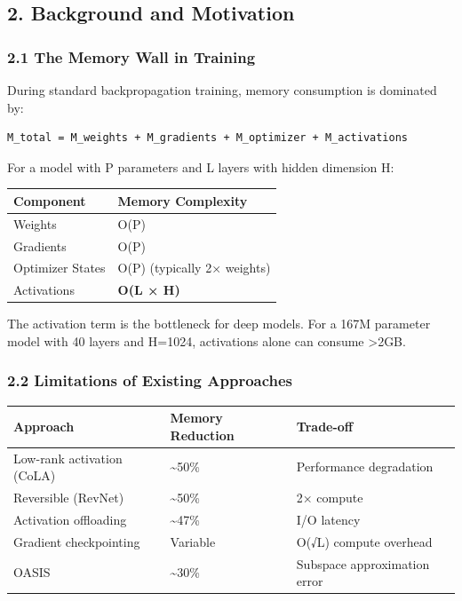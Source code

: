 \documentclass[
  11pt,
  a4paper,
]{article}
\begin{document}
\subsection{2. Background and
Motivation}\label{background-and-motivation}

\subsubsection{2.1 The Memory Wall in
Training}\label{the-memory-wall-in-training}

During standard backpropagation training, memory consumption is
dominated by:

\begin{verbatim}
M_total = M_weights + M_gradients + M_optimizer + M_activations
\end{verbatim}

For a model with P parameters and L layers with hidden dimension H:

\begin{longtable}[]{@{}ll@{}}
\toprule\noalign{}
Component & Memory Complexity \\
\midrule\noalign{}
\endhead
\bottomrule\noalign{}
\endlastfoot
Weights & O(P) \\
Gradients & O(P) \\
Optimizer States & O(P) (typically 2× weights) \\
Activations & \textbf{O(L × H)} \\
\end{longtable}

The activation term is the bottleneck for deep models. For a 167M
parameter model with 40 layers and H=1024, activations alone can consume
\textgreater2GB.

\subsubsection{2.2 Limitations of Existing
Approaches}\label{limitations-of-existing-approaches}

\begin{longtable}[]{@{}lll@{}}
\toprule\noalign{}
Approach & Memory Reduction & Trade-off \\
\midrule\noalign{}
\endhead
\bottomrule\noalign{}
\endlastfoot
Low-rank activation (CoLA) & \textasciitilde50\% & Performance
degradation \\
Reversible (RevNet) & \textasciitilde50\% & 2× compute \\
Activation offloading & \textasciitilde47\% & I/O latency \\
Gradient checkpointing & Variable & O(√L) compute overhead \\
OASIS & \textasciitilde30\% & Subspace approximation error \\
\end{longtable}
\end{document}
